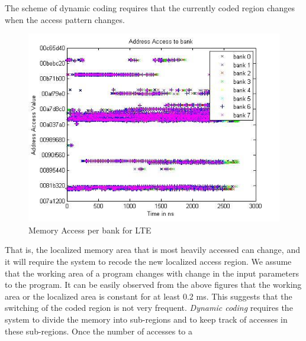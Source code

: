 The scheme of dynamic coding requires that the currently coded region changes 
when the access pattern changes.
\begin{figure}[htbp]
\centering
\includegraphics[width=0.5\linewidth]{fig/bank_access.jpg}
\caption{ Memory Access per bank for LTE }
\label{fig:bank_access}
\end{figure} That is, the localized memory area that is most heavily accessed 
can change, and it will require the system to recode the new localized access 
region. We assume that the working area of a program changes with change in the 
input parameters to the program. It can be easily observed from the above 
figures that the working area or the localized area is constant for at least 0.2 
ms. This suggests that the switching of the coded region is not very frequent. 
{\em Dynamic coding} requires the system to divide the memory into sub-regions and to 
keep track of accesses in these sub-regions. Once the number of accesses to a 
